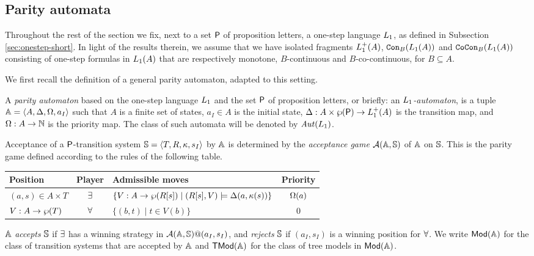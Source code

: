
\subsection{Parity automata}
\label{ssec:parityaut}

Throughout the rest of the section we fix, next to a set $\pprop$ of proposition 
letters, a one-step language $\oslang$, as defined in 
Subsection \ref{sec:onestep-short}.
In light of the results therein, we assume that we have isolated fragments 
$\oslang^+(A)$, $\cont{\oslang(A)}{B}$ and $\cocont{\oslang(A)}{B}$ consisting
of one-step formulas in $\oslang(A)$ that are respectively monotone, 
$B$-continuous and $B$-co-continuous, for $B \subseteq A$.

We first recall the definition of a general parity automaton, adapted to this
setting. 

\begin{definition} \label{def:partityaut}
A \emph{parity automaton} based on the one-step language $\oslang$ and the set
$\pprop$ of proposition letters, or briefly: an \emph{$\oslang$-automaton}, is a 
tuple $\bbA = \tup{A,\tmap,\pmap,a_I}$ such that $A$ is a finite set of states,
$a_I \in A$ is the initial state, $\tmap: A\times \pow(\pprop) \to \oslang^+(A)$
is the transition map, and $\pmap: A \to \nat$ is the priority map.
The class of such automata will be denoted by $\Aut(\oslang)$.

Acceptance of a $\pprop$-transition system $\bbS = \tup{T,R,\tscolors,s_I}$ by
$\bbA$ is determined by the \emph{acceptance game} $\agame(\bbA,\bbS)$ of $\bbA$
on $\bbS$. 
This is the parity game defined according to the rules of the following table.
\begin{center}
\small
\begin{tabular}{|l|c|l|c|} \hline
Position & Player & Admissible moves & Priority \\
\hline
    $(a,s) \in A \times T$
  & $\eloise$
  & $\{V : A \to \pow(R[s]) \mid (R[s],V) \models \tmap (a, \tscolors(s)) \}$
  & $\pmap(a)$ 
\\
    $V : A \rightarrow \pow(T)$
  & $\abelard$
  & $\{(b,t) \mid t \in V(b)\}$
  & $0$
\\ \hline
 \end{tabular}
\end{center}
%
$\bbA$ \emph{accepts} $\bbS$ if $\eloise$ has a winning strategy in 
$\agame(\bbA,\bbS)@(a_I,s_I)$, and \emph{rejects} $\bbS$ if $(a_I,s_I)$ is 
a winning position for $\abelard$. 
We write $\Mod(\bbA)$ for the class of transition systems that are accepted
by $\bbA$ and $\TMod(\bbA)$ for the class of tree models in $\Mod(\bbA)$.
\end{definition}

